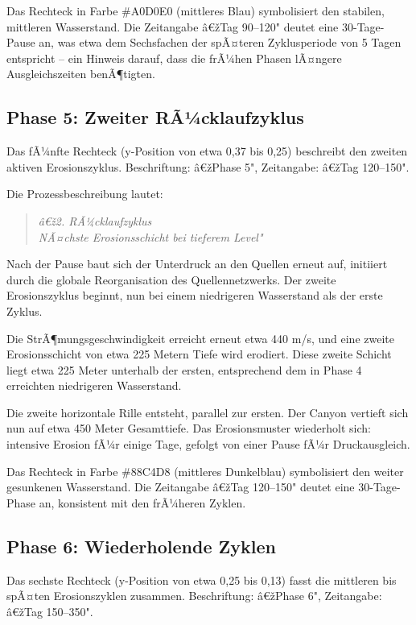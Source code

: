 ﻿\documentclass[12pt,a4paper]{report}
\begin{document}
Das Rechteck in Farbe \#A0D0E0 (mittleres Blau) symbolisiert den stabilen, mittleren Wasserstand. Die Zeitangabe â€žTag 90--120" deutet eine 30-Tage-Pause an, was etwa dem Sechsfachen der spÃ¤teren Zyklusperiode von 5 Tagen entspricht -- ein Hinweis darauf, dass die frÃ¼hen Phasen lÃ¤ngere Ausgleichszeiten benÃ¶tigten.

\subsection{Phase 5: Zweiter RÃ¼cklaufzyklus}

Das fÃ¼nfte Rechteck (y-Position von etwa 0,37 bis 0,25) beschreibt den zweiten aktiven Erosionszyklus. Beschriftung: â€žPhase 5", Zeitangabe: â€žTag 120--150".

Die Prozessbeschreibung lautet:
\begin{quote}
	\textit{â€ž2. RÃ¼cklaufzyklus\\
		NÃ¤chste Erosionsschicht bei tieferem Level"}
\end{quote}

Nach der Pause baut sich der Unterdruck an den Quellen erneut auf, initiiert durch die globale Reorganisation des Quellennetzwerks. Der zweite Erosionszyklus beginnt, nun bei einem niedrigeren Wasserstand als der erste Zyklus.

Die StrÃ¶mungsgeschwindigkeit erreicht erneut etwa 440 m/s, und eine zweite Erosionsschicht von etwa 225 Metern Tiefe wird erodiert. Diese zweite Schicht liegt etwa 225 Meter unterhalb der ersten, entsprechend dem in Phase 4 erreichten niedrigeren Wasserstand.

Die zweite horizontale Rille entsteht, parallel zur ersten. Der Canyon vertieft sich nun auf etwa 450 Meter Gesamttiefe. Das Erosionsmuster wiederholt sich: intensive Erosion fÃ¼r einige Tage, gefolgt von einer Pause fÃ¼r Druckausgleich.

Das Rechteck in Farbe \#88C4D8 (mittleres Dunkelblau) symbolisiert den weiter gesunkenen Wasserstand. Die Zeitangabe â€žTag 120--150" deutet eine 30-Tage-Phase an, konsistent mit den frÃ¼heren Zyklen.

\subsection{Phase 6: Wiederholende Zyklen}

Das sechste Rechteck (y-Position von etwa 0,25 bis 0,13) fasst die mittleren bis spÃ¤ten Erosionszyklen zusammen. Beschriftung: â€žPhase 6", Zeitangabe: â€žTag 150--350".
\end{document}
